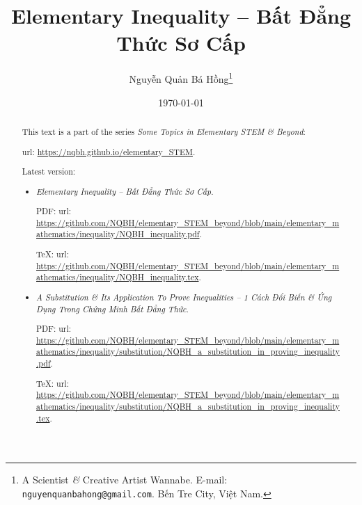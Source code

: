 \documentclass{article}
\title{Elementary Inequality -- Bất Đẳng Thức Sơ Cấp}
\author{Nguyễn Quản Bá Hồng\footnote{A Scientist {\it\&} Creative Artist Wannabe. E-mail: {\tt nguyenquanbahong@gmail.com}. Bến Tre City, Việt Nam.}}
\date{\today}
\begin{document}
\maketitle
\begin{abstract}
	This text is a part of the series {\it Some Topics in Elementary STEM \& Beyond}:
	
	{\sc url}: \url{https://nqbh.github.io/elementary_STEM}.
	
	Latest version:
	\begin{itemize}
		\item {\it Elementary Inequality -- Bất Đẳng Thức Sơ Cấp}.
		
		PDF: {\sc url}: \url{https://github.com/NQBH/elementary_STEM_beyond/blob/main/elementary_mathematics/inequality/NQBH_inequality.pdf}.
		
		\TeX: {\sc url}: \url{https://github.com/NQBH/elementary_STEM_beyond/blob/main/elementary_mathematics/inequality/NQBH_inequality.tex}.
		\item {\it A Substitution \& Its Application To Prove Inequalities -- 1 Cách Đổi Biến \& Ứng Dụng Trong Chứng Minh Bất Đẳng Thức}.
		
		PDF: {\sc url}: \url{https://github.com/NQBH/elementary_STEM_beyond/blob/main/elementary_mathematics/inequality/substitution/NQBH_a_substitution_in_proving_inequality.pdf}.
		
		\TeX: {\sc url}: \url{https://github.com/NQBH/elementary_STEM_beyond/blob/main/elementary_mathematics/inequality/substitution/NQBH_a_substitution_in_proving_inequality.tex}.
	\end{itemize}
\end{abstract}
\tableofcontents

\end{document}
